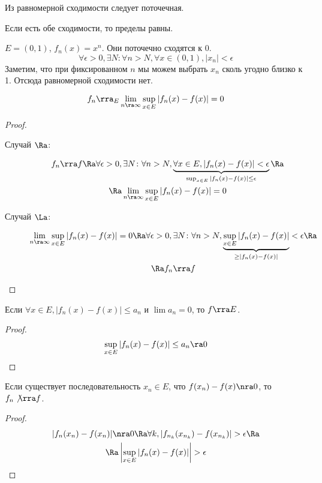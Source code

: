 \begin{Rem}
	Из равномерной сходимости следует поточечная.
\end{Rem}
\begin{Rem}
	Если есть обе сходимости, то пределы равны.
\end{Rem}

\begin{exmp}
	$E = (0, 1)$, $f_n(x) = x^n$.
	Они поточечно сходятся к $0$.
	\[ \forall \epsilon > 0, \exists N\colon \forall n > N, \forall x \in (0, 1), |x_n| < \epsilon \]
	Заметим, что при фиксированном $n$ мы можем выбрать $x_n$ сколь угодно близко к 1.
	Отсюда равномерной сходимости нет.
\end{exmp}

\begin{theorem}
	\[ f_n \rra_E \lim_{n\ra\infty} \sup_{x \in E} |f_n(x) - f(x)| = 0 \]
\end{theorem}
\begin{proof}
	\begin{description}
	\item[Случай $\Ra$:]
		\begin{gather*}
			f_n \rra f
			\Ra \forall \epsilon > 0, \exists N\colon \forall n > N, \underbrace{\forall x \in E, |f_n(x) - f(x)| < \epsilon}_{\sup_{x \in E} |f_n(x) - f(x)| \le \epsilon} \Ra \\
			\Ra \lim_{n\ra\infty} \sup_{x \in E} |f_n(x) - f(x)| = 0
		\end{gather*}

	\item[Случай $\La$:]
		\begin{gather*}
			\lim_{n\ra\infty} \sup_{x \in E} |f_n(x) - f(x)| = 0
			\Ra \forall \epsilon > 0, \exists N\colon \forall n > N, \underbrace{\sup_{x \in E} |f_n(x) - f(x)|}_{\ge |f_n(x) - f(x)|} < \epsilon \Ra \\
			\Ra f_n \rra f
		\end{gather*}
	\end{description}
\end{proof}

\begin{conseq}
	Если $\forall x \in E, |f_n(x) - f(x)| \le a_n$ и $\lim a_n = 0$, то $f \rra E$.
\end{conseq}
\begin{proof}
	\[ \sup_{x \in E} |f_n(x) - f(x)| \le a_n \ra 0 \]
\end{proof}

\begin{conseq}
	Если существует последовательность $x_n \in E$, что $f(x_n) - f(x) \nra 0$, то $f_n \not\rra f$.
\end{conseq}
\begin{proof}
	\begin{gather*}
		|f_n(x_n) - f(x_n)| \nra 0
		\Ra \forall k, |f_{n_k}(x_{n_k}) - f(x_{n_k})| > \epsilon \Ra \\
		\Ra \left| \sup_{x \in E} |f_n(x) - f(x)| \right| > \epsilon
	\end{gather*}
\end{proof}

